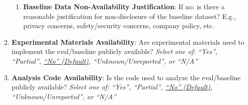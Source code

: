 \documentclass{article}
\begin{document}
\begin{enumerate}[leftmargin=30pt, topsep=0pt, itemsep=0pt]
\begin{enumerate}
        \item \textbf{Baseline Data Non-Availability Justification}: If no: is there a reasonable justification for non-disclosure of the baseline dataset? E.g., privacy concerns, safety/security concerns, company policy, etc.
    \end{enumerate}
    \item \textbf{Experimental Materials Availability}: Are experimental materials used to implement the eval/baseline publicly available?
    \newline \textit{Select one of: ``Yes'', ``Partial'', \ul{``No'' (Default)}, ``Unknown/Unreported'', or ``N/A''}
    
    \item \textbf{Analysis Code Availability}: Is the code used to analyze the eval/baseline publicly available?
    \newline \textit{Select one of: ``Yes'', ``Partial'', \ul{``No'' (Default)}, ``Unknown/Unreported'', or ``N/A''}
\end{enumerate}
\end{document}
